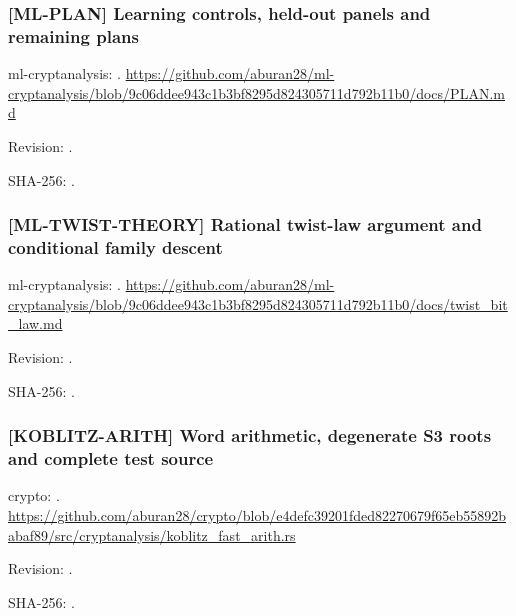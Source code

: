 \par\noindent\begin{minipage}{\linewidth}\small
\subsubsection*{[ML-PLAN] Learning controls, held-out panels and remaining plans}\label{art:ML-PLAN}
ml-cryptanalysis: .
\url{https://github.com/aburan28/ml-cryptanalysis/blob/9c06ddee943c1b3bf8295d824305711d792b11b0/docs/PLAN.md}
\par Revision: .
\par SHA-256: .
\end{minipage}\par\medskip

\par\noindent\begin{minipage}{\linewidth}\small
\subsubsection*{[ML-TWIST-THEORY] Rational twist-law argument and conditional family descent}\label{art:ML-TWIST-THEORY}
ml-cryptanalysis: .
\url{https://github.com/aburan28/ml-cryptanalysis/blob/9c06ddee943c1b3bf8295d824305711d792b11b0/docs/twist_bit_law.md}
\par Revision: .
\par SHA-256: .
\end{minipage}\par\medskip

\par\noindent\begin{minipage}{\linewidth}\small
\subsubsection*{[KOBLITZ-ARITH] Word arithmetic, degenerate S3 roots and complete test source}\label{art:KOBLITZ-ARITH}
crypto: .
\url{https://github.com/aburan28/crypto/blob/e4defc39201fded82270679f65eb55892babaf89/src/cryptanalysis/koblitz_fast_arith.rs}
\par Revision: .
\par SHA-256: .
\end{minipage}\par\medskip

